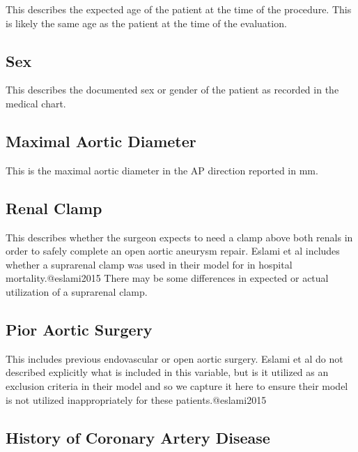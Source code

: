\documentclass[
]{book}
\begin{document}
This describes the expected age of the patient at the time of the procedure. This is likely the same age as the patient at the time of the evaluation.

\hypertarget{sex}{%
\subsection{Sex}\label{sex}}

This describes the documented sex or gender of the patient as recorded in the medical chart.

\hypertarget{maximal-aortic-diameter}{%
\subsection{Maximal Aortic Diameter}\label{maximal-aortic-diameter}}

This is the maximal aortic diameter in the AP direction reported in mm.

\hypertarget{renal-clamp}{%
\subsection{Renal Clamp}\label{renal-clamp}}

This describes whether the surgeon expects to need a clamp above both renals in order to safely complete an open aortic aneurysm repair. Eslami et al includes whether a suprarenal clamp was used in their model for in hospital mortality.@eslami2015 There may be some differences in expected or actual utilization of a suprarenal clamp.

\hypertarget{pior-aortic-surgery}{%
\subsection{Pior Aortic Surgery}\label{pior-aortic-surgery}}

This includes previous endovascular or open aortic surgery. Eslami et al do not described explicitly what is included in this variable, but is it utilized as an exclusion criteria in their model and so we capture it here to ensure their model is not utilized inappropriately for these patients.@eslami2015

\hypertarget{history-of-coronary-artery-disease}{%
\subsection{History of Coronary Artery Disease}\label{history-of-coronary-artery-disease}}
\end{document}
